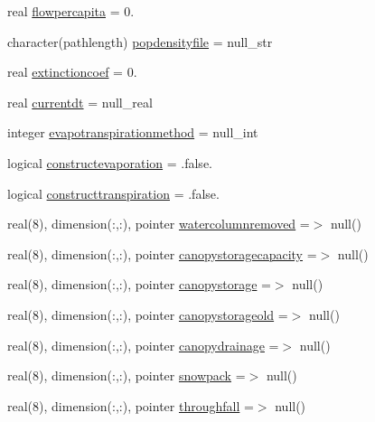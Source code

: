 \begin{DoxyCompactItemize}
\item 
real \mbox{\hyperlink{structmodulebasin_1_1t__basin_a075d87c76f475f79e14ec60c2e1b66a1}{flowpercapita}} = 0.
\item 
character(pathlength) \mbox{\hyperlink{structmodulebasin_1_1t__basin_aeaabf304a8e51611fbcf01d6ac704c80}{popdensityfile}} = null\+\_\+str
\item 
real \mbox{\hyperlink{structmodulebasin_1_1t__basin_ad410f943931837bf28dd89f4d3977d33}{extinctioncoef}} = 0.
\item 
real \mbox{\hyperlink{structmodulebasin_1_1t__basin_ab99fe747e3c5b3c9410da0ef774d6888}{currentdt}} = null\+\_\+real
\item 
integer \mbox{\hyperlink{structmodulebasin_1_1t__basin_a425804451132ac89beb22462abc78245}{evapotranspirationmethod}} = null\+\_\+int
\item 
logical \mbox{\hyperlink{structmodulebasin_1_1t__basin_a37672481afedb1beadb1a7410d4b4964}{constructevaporation}} = .false.
\item 
logical \mbox{\hyperlink{structmodulebasin_1_1t__basin_a546d909486f80cfe0bc957dd96567fdc}{constructtranspiration}} = .false.
\item 
real(8), dimension(\+:,\+:), pointer \mbox{\hyperlink{structmodulebasin_1_1t__basin_a05871c7b9a1a6c1585b6a8b7613012f3}{watercolumnremoved}} =$>$ null()
\item 
real(8), dimension(\+:,\+:), pointer \mbox{\hyperlink{structmodulebasin_1_1t__basin_acf227b4b80c4ba3494ea051d66ef03a0}{canopystoragecapacity}} =$>$ null()
\item 
real(8), dimension(\+:,\+:), pointer \mbox{\hyperlink{structmodulebasin_1_1t__basin_a1b4b2bb595c9b39fda179e8f9745f320}{canopystorage}} =$>$ null()
\item 
real(8), dimension(\+:,\+:), pointer \mbox{\hyperlink{structmodulebasin_1_1t__basin_a884298a3796706c1ed4c0d2040c9f72d}{canopystorageold}} =$>$ null()
\item 
real(8), dimension(\+:,\+:), pointer \mbox{\hyperlink{structmodulebasin_1_1t__basin_a79cd280fde993a11a7a2c406037bfd03}{canopydrainage}} =$>$ null()
\item 
real(8), dimension(\+:,\+:), pointer \mbox{\hyperlink{structmodulebasin_1_1t__basin_a92c9c26b51b0b95efbdee62d8d4040a9}{snowpack}} =$>$ null()
\item 
real(8), dimension(\+:,\+:), pointer \mbox{\hyperlink{structmodulebasin_1_1t__basin_af07f50dea1f37cbdb1624f2340725e79}{throughfall}} =$>$ null()
\item 

\end{DoxyCompactItemize}
